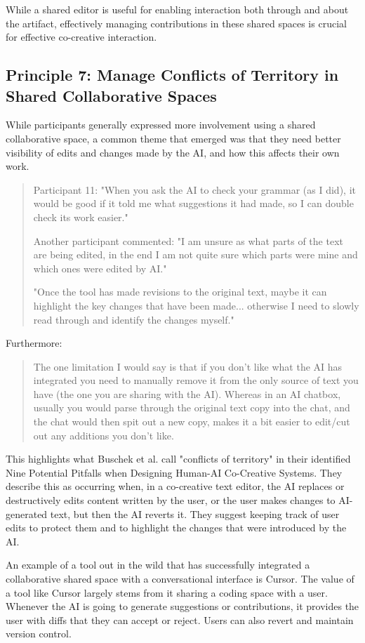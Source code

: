While a shared editor is useful for enabling interaction both through and about the artifact, effectively managing contributions in these shared spaces is crucial for effective co-creative interaction.

\subsection{Principle 7: Manage Conflicts of Territory in Shared Collaborative Spaces}

While participants generally expressed more involvement using a shared collaborative space, a common theme that emerged was that they need better visibility of edits and changes made by the AI, and how this affects their own work.

\begin{quote}
Participant 11: "When you ask the AI to check your grammar (as I did), it would be good if it told me what suggestions it had made, so I can double check its work easier."

Another participant commented: "I am unsure as what parts of the text are being edited, in the end I am not quite sure which parts were mine and which ones were edited by AI."

"Once the tool has made revisions to the original text, maybe it can highlight the key changes that have been made... otherwise I need to slowly read through and identify the changes myself."
\end{quote}
Furthermore:
\begin{quote}
The one limitation I would say is that if you don't like what the AI has integrated you need to manually remove it from the only source of text you have (the one you are sharing with the AI). Whereas in an AI chatbox, usually you would parse through the original text copy into the chat, and the chat would then spit out a new copy, makes it a bit easier to edit/cut out any additions you don't like.
\end{quote}
This highlights what Buschek et al. \cite{Buschek2021-ks} call "conflicts of territory" in their identified Nine Potential Pitfalls when Designing Human-AI Co-Creative Systems. They describe this as occurring when, in a co-creative text editor, the AI replaces or destructively edits content written by the user, or the user makes changes to AI-generated text, but then the AI reverts it. They suggest keeping track of user edits to protect them and to highlight the changes that were introduced by the AI.

An example of a tool out in the wild that has successfully integrated a collaborative shared space with a conversational interface is Cursor. The value of a tool like Cursor largely stems from it sharing a coding space with a user. Whenever the AI is going to generate suggestions or contributions, it provides the user with diffs that they can accept or reject. Users can also revert and maintain version control.

